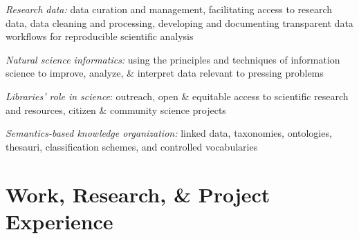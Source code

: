 \documentclass[12pt,letterpaper]{report}
\newcommand{\listitemspace}{0.25em}
\renewenvironment{itemize}
{\begin{list}{}{\setlength{\leftmargin}{0em}
            \setlength{\parskip}{0em}
            \setlength{\itemsep}{\listitemspace}
            \setlength{\parsep}{\listitemspace}}}
{\end{list}}
\begin{document}
\begin{itemize}

	\item \textit{Research data:} data curation and management, facilitating access to research data, data cleaning and processing, developing and documenting transparent data workflows for reproducible scientific analysis

	\item \textit{Natural science informatics:} using the principles and techniques of information science to improve, analyze, \& interpret data relevant to pressing problems

	\item \textit{Libraries' role in science}: outreach, open \& equitable access to scientific research and resources, citizen \& community science projects

	\item \textit{Semantics-based knowledge organization:} linked data, taxonomies, ontologies, thesauri, classification schemes, and controlled vocabularies

\end{itemize}



\section*{Work, Research, \& Project Experience}
\end{document}

